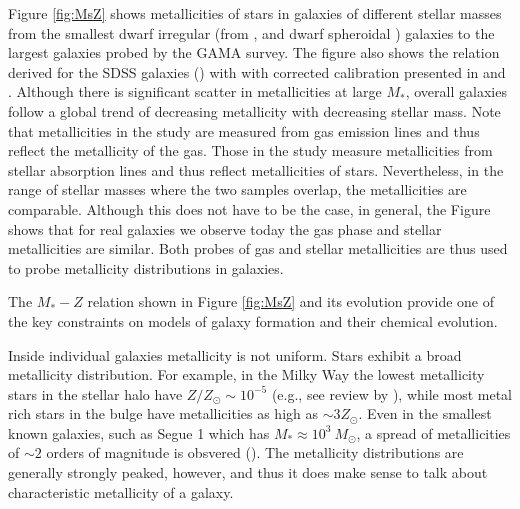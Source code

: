 Figure \ref{fig:MsZ}  shows metallicities of stars in galaxies of different stellar masses from the smallest dwarf irregular  (from \href{http://adsabs.harvard.edu/abs/2006ApJ...647..970L}{\citealt{lee_etal06}}, and dwarf spheroidal \href{http://adsabs.harvard.edu/abs/2013ApJ...779..102K}{\citealt{kirby_etal13}}) galaxies to the largest galaxies probed by the GAMA survey. The figure also shows the relation derived for the SDSS galaxies (\href{http://adsabs.harvard.edu/abs/2004ApJ...613..898T}{\citealt{tremonti_etal04}}) with with corrected calibration presented in \href{http://adsabs.harvard.edu/abs/2008ApJ...681.1183K}{\citet{kewley_ellison08}} and \href{http://www.aanda.org/component/article?access=bibcode&bibcode=&bibcode=2008A%2526A...488..463MFUL}{\citet{maiolino_etal08}}.
Although there is significant scatter in metallicities at large $M_*$, overall galaxies follow a global trend of decreasing metallicity with decreasing stellar mass. Note that metallicities in the \href{http://adsabs.harvard.edu/abs/2006ApJ...647..970L}{\citet{lee_etal06}} study are measured from gas emission lines and thus reflect the metallicity of the gas. Those in the \href{http://adsabs.harvard.edu/abs/2013ApJ...779..102K}{\citealt{kirby_etal13}} study measure metallicities from stellar absorption lines and thus reflect metallicities of stars. Nevertheless, in the range of stellar masses where the two samples overlap, the metallicities are comparable. Although this does not have to be the case, in general, the Figure shows that for real galaxies we observe today the gas phase and stellar metallicities are similar. Both probes of gas and stellar metallicities are thus used to probe metallicity distributions in galaxies. 

The $M_*-Z$ relation shown in Figure \ref{fig:MsZ} and its evolution provide one of the key constraints on models of galaxy formation and their chemical evolution. 

Inside individual galaxies metallicity is not uniform. Stars exhibit a broad metallicity distribution. 
For example, in the Milky Way the lowest metallicity stars in the stellar halo have $Z/Z_\odot\sim 10^{-5}$ (e.g., see review by \href{http://adsabs.harvard.edu/abs/2015ARA%26A..53..631F}{\citealt{frebel_norris15}}), while most metal rich stars in the bulge have metallicities as high as $\sim 3Z_\odot$. Even in the smallest known galaxies, such as Segue 1 which has $M_*\approx 10^3\ M_\odot$, a spread of metallicities of $\sim 2$ orders of magnitude is obsvered (\href{http://adsabs.harvard.edu/abs/2011ApJ...733...46S}{\citealt{simon_etal11}}). The metallicity distributions are generally strongly peaked, however, and thus it does make sense to talk about characteristic metallicity of a galaxy.

